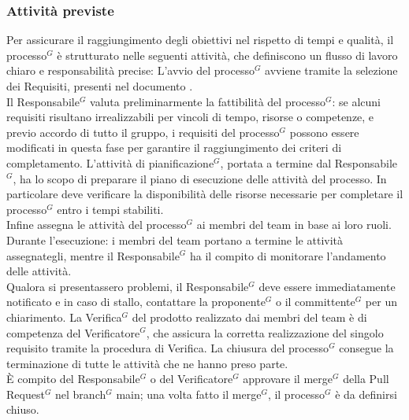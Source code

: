  \subsubsection{Attività previste}
 Per assicurare il raggiungimento degli obiettivi nel rispetto di tempi e qualità, il processo$^G$ è strutturato nelle seguenti attività, che definiscono un flusso di lavoro chiaro e responsabilità precise:
    L’avvio del processo$^G$ avviene tramite la selezione dei Requisiti, presenti nel documento .\\
    Il Responsabile$^G$ valuta preliminarmente la fattibilità del processo$^G$: se alcuni requisiti risultano irrealizzabili per vincoli di tempo, risorse o competenze, e previo accordo di tutto il gruppo, i requisiti del processo$^G$ possono essere modificati in questa fase per garantire il raggiungimento dei criteri di completamento.
    L’attività di pianificazione$^G$, portata a termine dal Responsabile$^G$, ha lo scopo di preparare il piano di esecuzione delle attività del processo. 
    In particolare deve verificare la disponibilità delle risorse necessarie per completare il processo$^G$ entro i tempi stabiliti.\\
    Infine assegna le attività del processo$^G$ ai membri del team in base ai loro ruoli.
    Durante l’esecuzione: i membri del team portano a termine le attività assegnategli, mentre il Responsabile$^G$ ha il compito di monitorare l’andamento delle attività.\\
    Qualora si presentassero problemi, il Responsabile$^G$ deve essere immediatamente notificato e in caso di stallo, contattare la proponente$^G$ o il committente$^G$ per un chiarimento.
    La Verifica$^G$ del prodotto realizzato dai membri del team è di competenza del Verificatore$^G$, che assicura la corretta realizzazione del singolo requisito tramite la procedura di Verifica. 
    La chiusura del processo$^G$ consegue la terminazione di tutte le attività che ne hanno preso parte.\\
    È compito del Responsabile$^G$ o del Verificatore$^G$ approvare il merge$^G$ della Pull Request$^G$ nel branch$^G$ main; una volta fatto il merge$^G$, il processo$^G$ è da definirsi chiuso.

